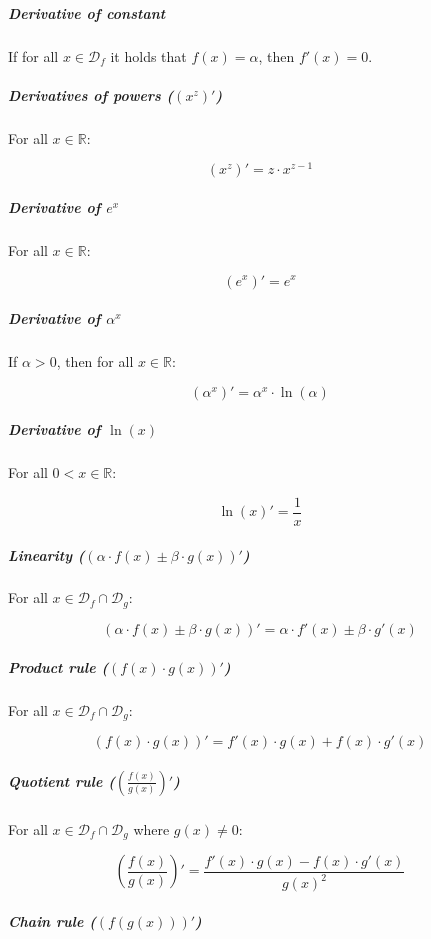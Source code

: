 \documentclass{article}
\begin{document}
            \subparagraph{Derivative of constant}

              If for all $x \in \mathcal{D}_f$ it holds that $f(x) = \alpha$,
              then $f'(x) = 0$.

            \subparagraph{Derivatives of powers ($\left( x^z \right)'$)}

              For all $x \in \mathbb{R}$:

              $$\left( x^z \right)' =z \cdot x^{z - 1}$$

            \subparagraph{Derivative of $e^x$}

              For all $x \in \mathbb{R}$:

              $$\left( e^x \right)' = e^x$$

            \subparagraph{Derivative of $\alpha^x$}

              If $\alpha > 0$, then for all $x \in \mathbb{R}$:

              $$\left( \alpha^x \right)' = \alpha^x \cdot \ln(\alpha)$$

            \subparagraph{Derivative of $\ln(x)$}

              For all $0 < x \in \mathbb{R}$:

              $$\ln(x)' = \frac{1}{x}$$

            \subparagraph{%
              Linearity ($(\alpha \cdot f(x) \pm \beta \cdot g(x))'$)
            }

              For all $x \in \mathcal{D}_f \cap \mathcal{D}_g$:

              $$
                (\alpha \cdot f(x) \pm \beta \cdot g(x))'
                  = \alpha \cdot f'(x) \pm \beta \cdot g'(x)
              $$

            \subparagraph{Product rule ($(f(x) \cdot g(x))'$)}

              For all $x \in \mathcal{D}_f \cap \mathcal{D}_g$:

              $$(f(x) \cdot g(x))' = f'(x) \cdot g(x) + f(x) \cdot g'(x)$$

            \subparagraph{Quotient rule ($\left( \frac{f(x)}{g(x)} \right)'$)}

              For all $x \in \mathcal{D}_f \cap \mathcal{D}_g$ where
              $g(x) \neq 0$:

              $$
                \left( \frac{f(x)}{g(x)} \right)'
                  = \frac{f'(x) \cdot g(x) - f(x) \cdot g'(x)}{g(x)^2}
              $$

            \subparagraph{Chain rule ($(f(g(x)))'$)}
\end{document}
